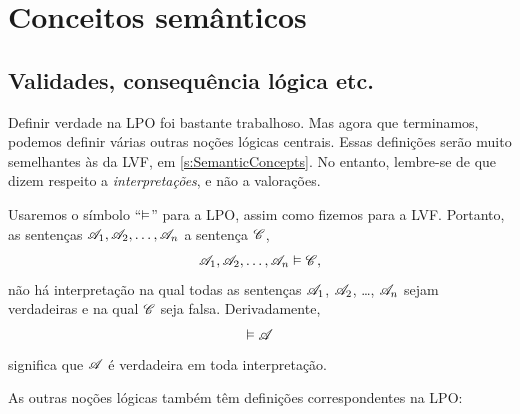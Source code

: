 \chapter{Conceitos semânticos}

\section{Validades, consequência lógica etc.}

Definir verdade na LPO foi bastante trabalhoso. Mas agora que terminamos, podemos definir várias outras noções lógicas centrais. Essas definições serão muito semelhantes às da LVF, em \cref{s:SemanticConcepts}. No entanto, lembre-se de que dizem respeito a \emph{interpretações}, e não a valorações.

Usaremos o símbolo \textquotedblleft $\vDash$\textquotedblright{} para a LPO, assim como fizemos para a LVF. Portanto,
as sentenças $\mathscr{A}_1, \mathscr{A}_2, \ldots, \mathscr{A}_n$
 a sentença $\mathscr{C}$,
	$$\mathscr{A}_1, \mathscr{A}_2, \ldots, \mathscr{A}_n \vDash\mathscr{C},$$
\ifeff{} não há interpretação na qual todas as sentenças $\mathscr{A}_1$, $\mathscr{A}_2$, \dots, $\mathscr{A}_n$ sejam verdadeiras e na qual $\mathscr{C}$ seja falsa. Derivadamente,
	$$\vDash\mathscr{A}$$
significa que $\mathscr{A}$ é verdadeira em toda interpretação.

As outras noções lógicas também têm definições correspondentes na LPO:

